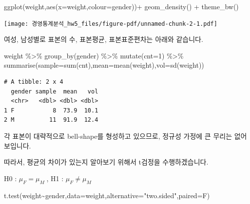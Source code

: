 \documentclass[
  a4paper,
  DIV=11,
  numbers=noendperiod]{scrreprt}
\newenvironment{Shaded}{\begin{snugshade}}{\end{snugshade}}
\newcommand{\AttributeTok}[1]{\textcolor[rgb]{0.40,0.45,0.13}{#1}}
\newcommand{\DecValTok}[1]{\textcolor[rgb]{0.68,0.00,0.00}{#1}}
\newcommand{\FunctionTok}[1]{\textcolor[rgb]{0.28,0.35,0.67}{#1}}
\newcommand{\NormalTok}[1]{\textcolor[rgb]{0.00,0.23,0.31}{#1}}
\newcommand{\SpecialCharTok}[1]{\textcolor[rgb]{0.37,0.37,0.37}{#1}}
\newcommand{\StringTok}[1]{\textcolor[rgb]{0.13,0.47,0.30}{#1}}
\begin{document}
\begin{Shaded}
\begin{Highlighting}[]
\FunctionTok{ggplot}\NormalTok{(weight,}\FunctionTok{aes}\NormalTok{(}\AttributeTok{x=}\NormalTok{weight,}\AttributeTok{colour=}\NormalTok{gender))}\SpecialCharTok{+}
  \FunctionTok{geom\_density}\NormalTok{() }\SpecialCharTok{+}
  \FunctionTok{theme\_bw}\NormalTok{()}
\end{Highlighting}
\end{Shaded}

\texttt{[image: 경영통계분석\_hw5\_files/figure-pdf/unnamed-chunk-2-1.pdf]}

여성, 남성별로 표본의 수, 표본평균, 표본표준편차는 아래와 같습니다.

\begin{Shaded}
\begin{Highlighting}[]
\NormalTok{weight }\SpecialCharTok{\%\textgreater{}\%}
  \FunctionTok{group\_by}\NormalTok{(gender) }\SpecialCharTok{\%\textgreater{}\%} 
  \FunctionTok{mutate}\NormalTok{(}\AttributeTok{cnt=}\DecValTok{1}\NormalTok{) }\SpecialCharTok{\%\textgreater{}\%} 
  \FunctionTok{summarise}\NormalTok{(}\AttributeTok{sample=}\FunctionTok{sum}\NormalTok{(cnt),}\AttributeTok{mean=}\FunctionTok{mean}\NormalTok{(weight),}\AttributeTok{vol=}\FunctionTok{sd}\NormalTok{(weight))}
\end{Highlighting}
\end{Shaded}

\begin{verbatim}
# A tibble: 2 x 4
  gender sample  mean   vol
  <chr>   <dbl> <dbl> <dbl>
1 F           8  73.9  10.1
2 M          11  91.9  12.4
\end{verbatim}

각 표본이 대략적으로 bell-shape를 형성하고 있으므로, 정규성 가정에 큰
무리는 없어보입니다.

따라서, 평균의 차이가 있는지 알아보기 위해서 t검정을 수행하겠습니다.

H0 : \(\mu_F=\mu_M\;\), H1 : \(\mu_F\neq\mu_M\)

\begin{Shaded}
\begin{Highlighting}[]
\FunctionTok{t.test}\NormalTok{(weight}\SpecialCharTok{\textasciitilde{}}\NormalTok{gender,}\AttributeTok{data=}\NormalTok{weight,}\AttributeTok{alternative=}\StringTok{"two.sided"}\NormalTok{,}\AttributeTok{paired=}\NormalTok{F)}
\end{Highlighting}
\end{Shaded}
\end{document}
